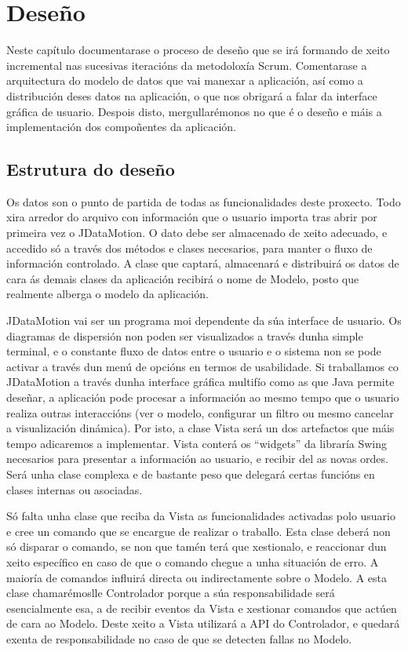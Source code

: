 \chapter{Deseño}

Neste capítulo documentarase o proceso de deseño que se irá formando de xeito incremental nas sucesivas iteracións da metodoloxía Scrum. Comentarase a arquitectura do modelo de datos que vai manexar a aplicación, así como a distribución deses datos na aplicación, o que nos obrigará a falar da interface gráfica de usuario. Despois disto, mergullarémonos no que é o deseño e máis a implementación dos compoñentes da aplicación.

\section{Estrutura do deseño}

Os datos son o punto de partida de todas as funcionalidades deste proxecto. Todo xira arredor do arquivo con información que o usuario importa tras abrir por primeira vez o JDataMotion. O dato debe ser almacenado de xeito adecuado, e accedido só a través dos métodos e clases necesarios, para manter o fluxo de información controlado. A clase que captará, almacenará e distribuirá os datos de cara ás demais clases da aplicación recibirá o nome de Modelo, posto que realmente alberga o modelo da aplicación.

JDataMotion vai ser un programa moi dependente da súa interface de usuario. Os diagramas de dispersión non poden ser visualizados a través dunha simple terminal, e o constante fluxo de datos entre o usuario e o sistema non se pode activar a través dun menú de opcións en termos de usabilidade. Si traballamos co JDataMotion a través dunha interface gráfica multifío como as que Java permite deseñar, a aplicación pode procesar a información ao mesmo tempo que o usuario realiza outras interaccións (ver o modelo, configurar un filtro ou mesmo cancelar a visualización dinámica). Por isto, a clase Vista será un dos artefactos que máis tempo adicaremos a implementar. Vista conterá os ``widgets'' da libraría Swing necesarios para presentar a información ao usuario, e recibir del as novas ordes. Será unha clase complexa e de bastante peso que delegará certas funcións en clases internas ou asociadas.

Só falta unha clase que reciba da Vista as funcionalidades activadas polo usuario e cree un comando que se encargue de realizar o traballo. Esta clase deberá non só disparar o comando, se non que tamén terá que xestionalo, e reaccionar dun xeito específico en caso de que o comando chegue a unha situación de erro. A maioría de comandos influirá directa ou indirectamente sobre o Modelo. A esta clase chamarémoslle Controlador porque a súa responsabilidade será esencialmente esa, a de recibir eventos da Vista e xestionar comandos que actúen de cara ao Modelo. Deste xeito a Vista utilizará a API do Controlador, e quedará exenta de responsabilidade no caso de que se detecten fallas no Modelo.

